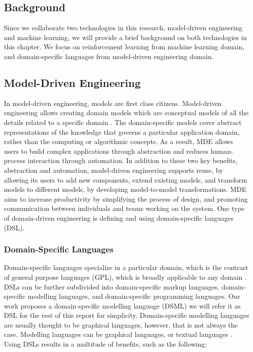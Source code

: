 \documentclass[11pt,letterpaper]{ryersonSGSThesis}
\begin{document}
\begin{ryersonSGSThesis}
\chapter{Background}
\label{chap:background}
     Since we collaborate two technologies in this research, model-driven engineering and machine learning, we will provide a brief background on both technologies in this chapter. We focus on reinforcement learning from machine learning domain, and domain-specific languages from model-driven engineering domain.
     
    \section{Model-Driven Engineering}
        In model-driven engineering, models are first class citizens. Model-driven engineering allows creating domain models which are conceptual models of all the details related to a specific domain \cite{Schmidt2006}. The domain-specific models cover abstract representations of the knowledge that governs a particular application domain, rather than the computing or algorithmic concepts. As a result, MDE allows users to build complex applications through abstraction and reduces human-process interaction through automation.
        In addition to these two key benefits, abstraction and automation, model-driven engineering supports reuse, by allowing its users to add new components, extend existing models, and transform models to different models, by developing model-to-model transformations. MDE aims to increase productivity by simplifying the process of design, and promoting communication between individuals and teams working on the system. One type of domain-driven engineering is defining and using domain-specific languages (DSL).

        \subsection{Domain-Specific Languages}
            Domain-specific languages specialize in a particular domain, which is the contrast of general purpose languages (GPL), which is broadly applicable to any domain \cite{Brambilla2017}. DSLs can be further subdivided into domain-specific markup languages, domain-specific modelling languages, and domain-specific programming languages. Our work proposes a domain-specific modelling language (DSML) we will refer it as DSL for the rest of this report for simplicity.
            Domain-specific modelling languages are usually thought to be graphical languages, however, that is not always the case. Modelling languages can be graphical languages, or textual languages \cite{Brambilla2017}. Using DSLs results in a multitude of benefits, such as the following:
            

\end{ryersonSGSThesis}
\end{document}
